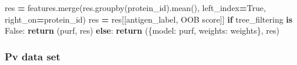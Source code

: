 \documentclass[
  11pt,
  oneside]{book}
\newenvironment{Shaded}{\begin{snugshade}}{\end{snugshade}}
\newcommand{\ControlFlowTok}[1]{\textcolor[rgb]{0.13,0.29,0.53}{\textbf{#1}}}
\newcommand{\KeywordTok}[1]{\textcolor[rgb]{0.13,0.29,0.53}{\textbf{#1}}}
\newcommand{\NormalTok}[1]{#1}
\newcommand{\OperatorTok}[1]{\textcolor[rgb]{0.81,0.36,0.00}{\textbf{#1}}}
\newcommand{\StringTok}[1]{\textcolor[rgb]{0.31,0.60,0.02}{#1}}
\newcommand{\VariableTok}[1]{\textcolor[rgb]{0.00,0.00,0.00}{#1}}
\begin{document}
\begin{Shaded}
\begin{Highlighting}[]
\NormalTok{    res }\OperatorTok{=}\NormalTok{ features.merge(res.groupby(}\StringTok{\textquotesingle{}protein\_id\textquotesingle{}}\NormalTok{).mean(), left\_index}\OperatorTok{=}\VariableTok{True}\NormalTok{, right\_on}\OperatorTok{=}\StringTok{\textquotesingle{}protein\_id\textquotesingle{}}\NormalTok{)}
\NormalTok{    res }\OperatorTok{=}\NormalTok{ res[[}\StringTok{\textquotesingle{}antigen\_label\textquotesingle{}}\NormalTok{, }\StringTok{\textquotesingle{}OOB score\textquotesingle{}}\NormalTok{]]}
    \ControlFlowTok{if}\NormalTok{ tree\_filtering }\KeywordTok{is} \VariableTok{False}\NormalTok{:}
        \ControlFlowTok{return}\NormalTok{ (purf, res)}
    \ControlFlowTok{else}\NormalTok{:}
        \ControlFlowTok{return}\NormalTok{ (\{}\StringTok{\textquotesingle{}model\textquotesingle{}}\NormalTok{: purf, }\StringTok{\textquotesingle{}weights\textquotesingle{}}\NormalTok{: weights\}, res)}
\end{Highlighting}
\end{Shaded}

\hypertarget{pv-data-set}{%
\subsubsection{Pv data set}\label{pv-data-set}}
\end{document}
